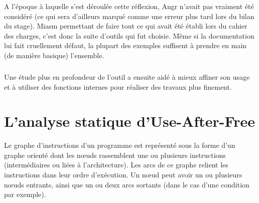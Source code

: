 A l'époque à laquelle s'est déroulée cette réflexion, Angr n'avait pas vraiment été
considéré (ce qui sera d'ailleurs marqué comme une erreur plus tard lors du bilan du stage).
Miasm permettant de faire tout ce qui avait été établi lors du cahier des charges, c'est donc la suite d'outils qui fut choisie.
Même si la documentation lui fait cruellement défaut, la plupart des exemples suffisent à prendre en main (de manière basique) l'ensemble.
\subparagraph{}
Une étude plus en profondeur de l'outil a ensuite aidé à mieux affiner son usage et à utiliser des fonctions internes pour réaliser des travaux
plus finement.

\section{L'analyse statique d'Use-After-Free}
Le graphe d'instructions d'un programme est représenté sous la forme d'un graphe orienté dont les nœuds rassemblent une ou plusieurs
instructions (intermédiaires ou liées à l'architecture). Les arcs de ce graphe relient les instructions dans leur ordre d'exécution.
Un nœud peut avoir un ou plusieurs nœuds entrants, ainsi que un ou deux arcs sortants (dans le cas d'une condition par exemple).
